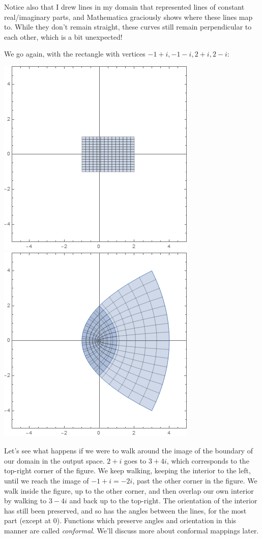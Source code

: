 Notice also that I drew lines in my domain that represented lines of constant real/imaginary parts, and Mathematica graciously shows where these lines map to. While they don't remain straight, these curves still remain perpendicular to each other, which is a bit unexpected!

We go again, with the rectangle with vertices $-1+i, -1-i, 2+i, 2-i$:
\begin{center}
    \includegraphics[scale=0.5]{images/domzsqr1.png}
    \includegraphics[scale=0.5]{images/ranzsqr1.png}
\end{center}
Let's see what happens if we were to walk around the image of the boundary of our domain in the output space. $2+i$ goes to $3+4i$, which corresponds to the top-right corner of the figure. We keep walking, keeping the interior to the left, until we reach the image of $-1+i = -2i$, past the other corner in the figure. We walk inside the figure, up to the other corner, and then overlap our own interior by walking to $3-4i$ and back up to the top-right. The orientation of the interior has still been preserved, and so has the angles between the lines, for the most part (except at 0). Functions which preserve angles and orientation in this manner are called \textit{conformal}. We'll discuss more about conformal mappings later.

